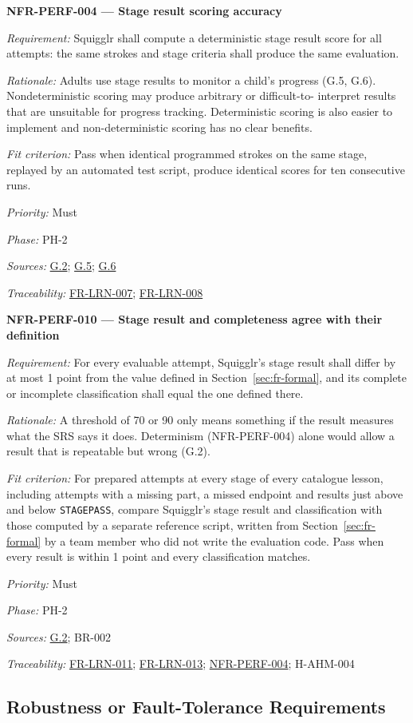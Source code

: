 \documentclass[12pt]{article}
\renewcommand{\_}{\textunderscore\allowbreak}%
\newcommand{\goalref}[1]{\hyperref[goal:#1]{G.#1}}
\newenvironment{srsrequirement}[2]{%
  \par\medskip\noindent\phantomsection\label{req:#1}%
  \textbf{#1 --- #2}\par\nobreak\smallskip }{\par\medskip}
\newcommand{\reqfield}[2]{\noindent\textit{#1:} #2\par}
\newcommand{\reqshall}[1]{\reqfield{Requirement}{#1}}
\newcommand{\reqrationale}[1]{\reqfield{Rationale}{#1}}
\newcommand{\reqfit}[1]{\reqfield{Fit criterion}{#1}}
\newcommand{\reqpriority}[1]{\reqfield{Priority}{#1}}
\newcommand{\reqphase}[1]{\reqfield{Phase}{#1}}
\newcommand{\reqsources}[1]{\reqfield{Sources}{#1}}
\newcommand{\reqtraces}[1]{\reqfield{Traceability}{#1}}
\newcommand{\reqref}[1]{\hyperref[req:#1]{#1}}
\begin{document}
\begin{srsrequirement}{NFR-PERF-004}{Stage result scoring accuracy}
  \reqshall{Squigglr shall compute a deterministic stage result score for all
attempts: the same strokes and stage criteria shall produce the same
evaluation.} \reqrationale{Adults use stage results to monitor a child's
progress (G.5, G.6). Nondeterministic scoring may produce arbitrary or
difficult-to- interpret results that are unsuitable for progress tracking.
Deterministic scoring is also easier to implement and non-deterministic scoring
has no clear benefits.} \reqfit{Pass when identical programmed strokes on the
same stage, replayed by an automated test script, produce identical scores for
ten consecutive runs.}
  \reqpriority{Must}
  \reqphase{PH-2}
  \reqsources{\goalref{2}; \goalref{5}; \goalref{6}}
  \reqtraces{\reqref{FR-LRN-007}; \reqref{FR-LRN-008}}
\end{srsrequirement}

\begin{srsrequirement}{NFR-PERF-010}{Stage result and completeness agree with their definition}
  \reqshall{For every evaluable attempt, Squigglr's stage result shall differ by
at most 1 point from the value defined in Section~\ref{sec:fr-formal}, and its
complete or incomplete classification shall equal the one defined there.}
\reqrationale{A threshold of 70 or 90 only means something if the result
measures what the SRS says it does. Determinism (NFR-PERF-004) alone would allow
a result that is repeatable but wrong (G.2).} \reqfit{For prepared attempts at
every stage of every catalogue lesson, including attempts with a missing part,
a missed endpoint and results just above and below \texttt{STAGE\_PASS}, compare
Squigglr's stage result and classification with those computed by a separate
reference script, written from Section~\ref{sec:fr-formal} by a team member
who did not write the evaluation code. Pass when every result is within 1 point
and every classification matches.}
  \reqpriority{Must}
  \reqphase{PH-2}
  \reqsources{\goalref{2}; BR-002}
  \reqtraces{\reqref{FR-LRN-011}; \reqref{FR-LRN-013};
  \reqref{NFR-PERF-004}; H-AHM-004}
\end{srsrequirement}

\subsection{Robustness or Fault-Tolerance Requirements}
\label{sec:robustness}
\end{document}
